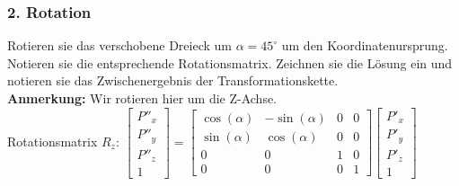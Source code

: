 \documentclass[11pt, a4paper]{article} %
\begin{document}
\begin{figure}[h]
\end{figure}

\newpage
\subsubsection*{2. Rotation}
Rotieren sie das verschobene Dreieck um $\alpha=45^\circ$ um den Koordinatenursprung. Notieren sie die entsprechende Rotationsmatrix. Zeichnen sie die Lösung ein und notieren sie das Zwischenergebnis der Transformationskette. \\[0.1cm]
\textbf{Anmerkung:} Wir rotieren hier um die Z-Achse. \\
Rotationsmatrix $R_z$: $\begin{bmatrix}
	P''_x \\ P''_y \\ P''_z \\ 1
\end{bmatrix} = \begin{bmatrix}
	\cos(\alpha) & -\sin(\alpha) & 0 & 0 \\ \sin(\alpha) & \cos(\alpha) & 0 & 0 \\ 0 & 0 & 1 & 0 \\ 0 & 0 & 0 & 1
\end{bmatrix} \begin{bmatrix}
	P'_x \\ P'_y \\ P'_z \\ 1
\end{bmatrix}$ \\
\end{document}
